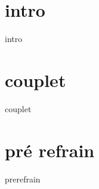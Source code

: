 
\songbooksongstruct

\newpage

\begin{multicols}{2}
	\xxxlyrics
\end{multicols}

\newpage
\section*{intro}
{intro}
\section*{couplet}
{couplet}
\section*{pré refrain}
{prerefrain}
